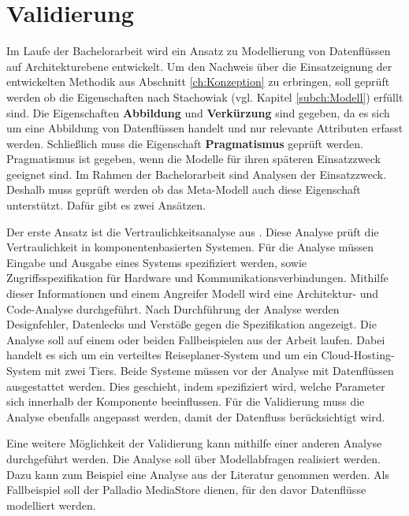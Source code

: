 
\chapter{Validierung}
\label{ch:Validierung}
Im Laufe der Bachelorarbeit wird ein Ansatz zu Modellierung von Datenflüssen auf Architekturebene entwickelt.
Um den Nachweis über die Einsatzeignung der entwickelten Methodik aus Abschnitt \ref{ch:Konzeption} zu erbringen, soll geprüft werden ob die Eigenschaften nach Stachowiak (vgl. Kapitel \ref{subch:Modell}) erfüllt sind. Die Eigenschaften \textbf{Abbildung} und \textbf{Verkürzung} sind gegeben, da es sich um eine Abbildung von Datenflüssen handelt und nur relevante Attributen erfasst werden. Schließlich muss die Eigenschaft \textbf{Pragmatismus} geprüft werden. Pragmatismus ist gegeben, wenn die Modelle für ihren späteren Einsatzzweck geeignet sind. Im Rahmen der Bachelorarbeit sind Analysen der Einsatzzweck. Deshalb muss geprüft werden ob das Meta-Modell auch diese Eigenschaft unterstützt. Dafür gibt es zwei Ansätzen.\par
Der erste Ansatz ist die Vertraulichkeitsanalyse aus \cite{Kramera}. Diese Analyse prüft die Vertraulichkeit in komponentenbasierten Systemen. Für die Analyse müssen Eingabe und Ausgabe eines Systems spezifiziert werden, sowie Zugriffsspezifikation für Hardware und Kommunikationsverbindungen. Mithilfe dieser Informationen und einem Angreifer Modell wird eine Architektur- und Code-Analyse durchgeführt. Nach Durchführung der Analyse werden Designfehler, Datenlecks und Verstöße gegen die Spezifikation angezeigt. Die Analyse soll auf einem oder beiden Fallbeispielen aus der Arbeit laufen. Dabei handelt es sich um ein verteiltes Reiseplaner-System und um ein Cloud-Hosting-System mit zwei Tiers. Beide Systeme müssen vor der Analyse mit Datenflüssen ausgestattet werden. Dies geschieht, indem spezifiziert wird, welche Parameter sich innerhalb der Komponente beeinflussen. Für die Validierung muss die Analyse ebenfalls angepasst werden, damit der Datenfluss berücksichtigt wird. \par
Eine weitere Möglichkeit der Validierung kann mithilfe einer anderen Analyse durchgeführt werden. Die Analyse soll über Modellabfragen realisiert werden. Dazu kann zum Beispiel eine Analyse aus der Literatur genommen werden. Als Fallbeispiel soll der Palladio MediaStore \cite{Reussner} dienen, für den davor Datenflüsse modelliert werden.

